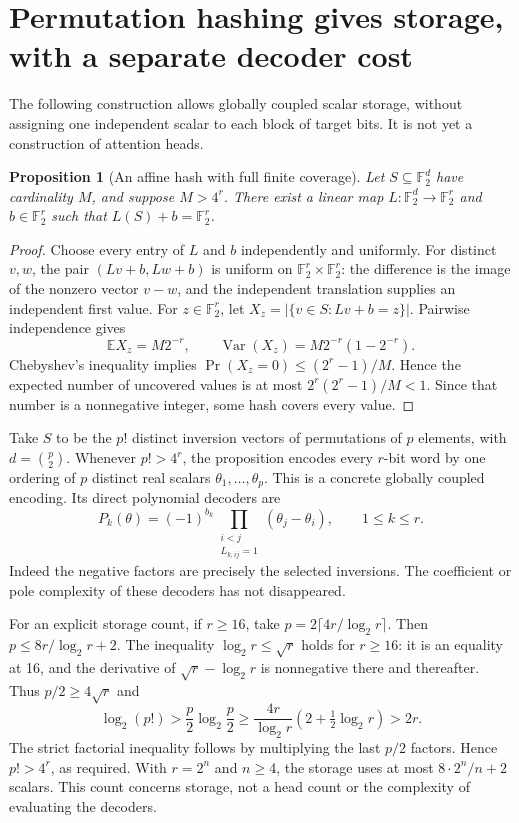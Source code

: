 \documentclass[11pt]{article}
\newtheorem{proposition}{Proposition}
\begin{document}
\section{Permutation hashing gives storage, with a separate decoder cost}

The following construction allows globally coupled scalar storage,
without assigning one independent scalar to each block of target bits.
It is not yet a construction of attention heads.

\begin{proposition}[An affine hash with full finite coverage]
Let $S\subseteq\mathbb F_2^d$ have cardinality $M$, and suppose
$M>4^r$. There exist a linear map $L:\mathbb F_2^d\to\mathbb F_2^r$
and $b\in\mathbb F_2^r$ such that $L(S)+b=\mathbb F_2^r$.
\end{proposition}
\begin{proof}
Choose every entry of $L$ and $b$ independently and uniformly.
For distinct $v,w$, the pair $(Lv+b,Lw+b)$ is uniform on
$\mathbb F_2^r\times\mathbb F_2^r$: the difference is the image
of the nonzero vector $v-w$, and the independent translation supplies
an independent first value. For $z\in\mathbb F_2^r$, let
$X_z=|\{v\in S:Lv+b=z\}|$. Pairwise independence gives
\[
 \mathbb E X_z=M2^{-r},\qquad
 \operatorname{Var}(X_z)=M2^{-r}(1-2^{-r}).
\]
Chebyshev's inequality implies
$\Pr(X_z=0)\le(2^r-1)/M$.
Hence the expected number of uncovered values is at most
$2^r(2^r-1)/M<1$. Since that number is a nonnegative integer,
some hash covers every value.
\end{proof}

Take $S$ to be the $p!$ distinct inversion vectors of permutations
of $p$ elements, with $d=\binom p2$. Whenever $p!>4^r$, the proposition
encodes every $r$-bit word by one ordering of $p$ distinct real scalars
$\theta_1,\ldots,\theta_p$. This is a concrete globally coupled
encoding. Its direct polynomial decoders are
\[
 P_k(\theta)=(-1)^{b_k}
       \prod_{\substack{i<j\\ L_{k,ij}=1}}(\theta_j-\theta_i),
 \qquad 1\le k\le r.
\]
Indeed the negative factors are precisely the selected inversions.
The coefficient or pole complexity of these decoders has not disappeared.

For an explicit storage count, if $r\ge16$, take
$p=2\lceil4r/\log_2 r\rceil$. Then $p\le8r/\log_2r+2$.
The inequality $\log_2r\le\sqrt r$ holds for $r\ge16$: it is an
equality at 16, and the derivative of $\sqrt r-\log_2r$ is
nonnegative there and thereafter. Thus $p/2\ge4\sqrt r$ and
\[
 \log_2(p!)>\frac p2\log_2\frac p2
 \ge\frac{4r}{\log_2r}\left(2+\tfrac12\log_2r\right)>2r.
\]
The strict factorial inequality follows by multiplying the last $p/2$
factors. Hence $p!>4^r$, as required. With $r=2^n$ and $n\ge4$, the storage
uses at most $8\cdot2^n/n+2$ scalars. This count concerns storage,
not a head count or the complexity of evaluating the decoders.
\end{document}
